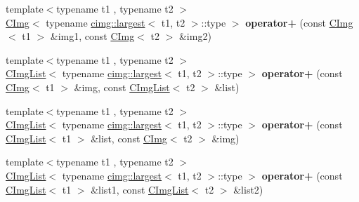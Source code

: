 \begin{DoxyCompactItemize}
\item 
\hypertarget{namespacecimg__library_aba12ac0ba6e557ee682af4ddcb1088aa}{
{\footnotesize template$<$typename t1 , typename t2 $>$ }\\\hyperlink{structcimg__library_1_1_c_img}{CImg}$<$ typename \hyperlink{structcimg__library_1_1cimg_1_1largest}{cimg::largest}$<$ t1, t2 $>$::type $>$ {\bfseries operator+} (const \hyperlink{structcimg__library_1_1_c_img}{CImg}$<$ t1 $>$ \&img1, const \hyperlink{structcimg__library_1_1_c_img}{CImg}$<$ t2 $>$ \&img2)}
\label{namespacecimg__library_aba12ac0ba6e557ee682af4ddcb1088aa}

\item 
\hypertarget{namespacecimg__library_aa61c8e3859536774b164b41ef627157c}{
{\footnotesize template$<$typename t1 , typename t2 $>$ }\\\hyperlink{structcimg__library_1_1_c_img_list}{CImgList}$<$ typename \hyperlink{structcimg__library_1_1cimg_1_1largest}{cimg::largest}$<$ t1, t2 $>$::type $>$ {\bfseries operator+} (const \hyperlink{structcimg__library_1_1_c_img}{CImg}$<$ t1 $>$ \&img, const \hyperlink{structcimg__library_1_1_c_img_list}{CImgList}$<$ t2 $>$ \&list)}
\label{namespacecimg__library_aa61c8e3859536774b164b41ef627157c}

\item 
\hypertarget{namespacecimg__library_a8c03d56b9ad53a03ecd70fc833785a20}{
{\footnotesize template$<$typename t1 , typename t2 $>$ }\\\hyperlink{structcimg__library_1_1_c_img_list}{CImgList}$<$ typename \hyperlink{structcimg__library_1_1cimg_1_1largest}{cimg::largest}$<$ t1, t2 $>$::type $>$ {\bfseries operator+} (const \hyperlink{structcimg__library_1_1_c_img_list}{CImgList}$<$ t1 $>$ \&list, const \hyperlink{structcimg__library_1_1_c_img}{CImg}$<$ t2 $>$ \&img)}
\label{namespacecimg__library_a8c03d56b9ad53a03ecd70fc833785a20}

\item 
\hypertarget{namespacecimg__library_ae3f966f564d9d5092089c2ac71812107}{
{\footnotesize template$<$typename t1 , typename t2 $>$ }\\\hyperlink{structcimg__library_1_1_c_img_list}{CImgList}$<$ typename \hyperlink{structcimg__library_1_1cimg_1_1largest}{cimg::largest}$<$ t1, t2 $>$::type $>$ {\bfseries operator+} (const \hyperlink{structcimg__library_1_1_c_img_list}{CImgList}$<$ t1 $>$ \&list1, const \hyperlink{structcimg__library_1_1_c_img_list}{CImgList}$<$ t2 $>$ \&list2)}
\label{namespacecimg__library_ae3f966f564d9d5092089c2ac71812107}


\end{DoxyCompactItemize}
